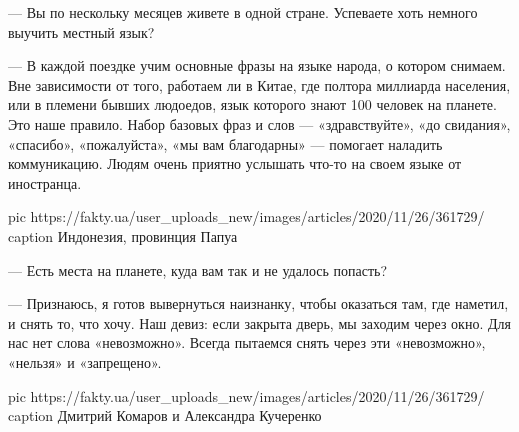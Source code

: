 — Вы по нескольку месяцев живете в одной стране. Успеваете хоть немного
выучить местный язык?

— В каждой поездке учим основные фразы на языке народа, о котором снимаем.
Вне зависимости от того, работаем ли в Китае, где полтора миллиарда
населения, или в племени бывших людоедов, язык которого знают 100 человек
на планете. Это наше правило. Набор базовых фраз и слов — «здравствуйте»,
«до свидания», «спасибо», «пожалуйста», «мы вам благодарны» — помогает
наладить коммуникацию. Людям очень приятно услышать что-то на своем языке
от иностранца.

\ifcmt
pic https://fakty.ua/user_uploads_new/images/articles/2020/11/26/361729/%
caption Индонезия, провинция Папуа
\fi


— Есть места на планете, куда вам так и не удалось попасть?

— Признаюсь, я готов вывернуться наизнанку, чтобы оказаться там, где
наметил, и снять то, что хочу. Наш девиз: если закрыта дверь, мы заходим
через окно. Для нас нет слова «невозможно». Всегда пытаемся снять через
эти «невозможно», «нельзя» и «запрещено».

\ifcmt
pic https://fakty.ua/user_uploads_new/images/articles/2020/11/26/361729/%
caption Дмитрий Комаров и Александра Кучеренко
\fi




